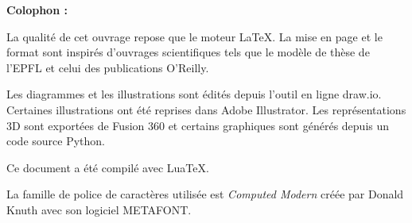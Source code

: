 \clearpage
\Large\textbf{Colophon :}\par\normalsize
\thispagestyle{empty}
La qualité de cet ouvrage repose que le moteur \LaTeX. La mise en page et le format sont inspirés d'ouvrages scientifiques tels que le modèle de thèse de l'EPFL et celui des publications O'Reilly.

Les diagrammes et les illustrations sont édités depuis l'outil en ligne draw.io. Certaines illustrations ont été reprises dans Adobe Illustrator. Les représentations 3D sont exportées de Fusion 360 et certains graphiques sont générés depuis un code source Python.



Ce document a été compilé avec \mbox{Lua\TeX}.

La famille de police de caractères utilisée est \emph{Computed Modern} créée par Donald Knuth avec son logiciel METAFONT.

\vfil


